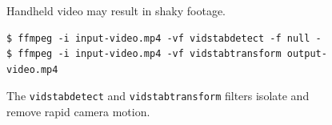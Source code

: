 \begingroup
\begin{subfigure}{\linewidth}

\vspace{-4pt}

\vspace{-4pt}
\caption{Handheld video may result in shaky footage.}
\end{subfigure}
\par\vspace{8.5pt}%
%
\begin{subfigure}{\linewidth}
\begingroup
\small
\leavevmode\kern80pt
\begin{BVerbatim}
$ ffmpeg -i input-video.mp4 -vf vidstabdetect -f null -
$ ffmpeg -i input-video.mp4 -vf vidstabtransform output-video.mp4
\end{BVerbatim}
\par\vspace{2.5pt}%
\endgroup

\vspace{-4pt}
\caption{The \texttt{vidstabdetect} and \texttt{vidstabtransform} filters isolate and remove rapid camera motion.}%
\end{subfigure}
\endgroup